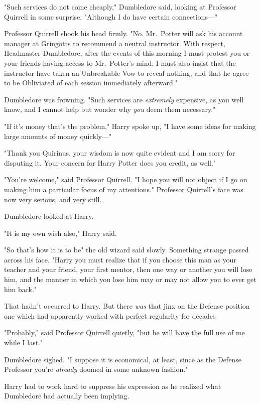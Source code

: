 "Such services do not come cheaply," Dumbledore said, looking at Professor
Quirrell in some surprise. "Although I do have certain connections—"

Professor Quirrell shook his head firmly. "No. Mr.~Potter will ask his account
manager at Gringotts to recommend a neutral instructor. With respect,
Headmaster Dumbledore, after the events of this morning I must protest you or
your friends having access to Mr.~Potter's mind. I must also insist that the
instructor have taken an Unbreakable Vow to reveal nothing, and that he agree
to be Obliviated of each session immediately afterward."

Dumbledore was frowning. "Such services are \emph{extremely} expensive, as you
well know, and I cannot help but wonder why \emph{you} deem them necessary."

"If it's money that's the problem," Harry spoke up, "I have some ideas for
making large amounts of money quickly—"

"Thank you Quirinus, your wisdom is now quite evident and I am sorry for
disputing it. Your concern for Harry Potter does you credit, as well."

"You're welcome," said Professor Quirrell. "I hope you will not object if I go
on making him a particular focus of my attentions." Professor Quirrell's face
was now very serious, and very still.

Dumbledore looked at Harry.

"It is my own wish also," Harry said.

"So that's how it is to be{\el}" the old wizard said slowly. Something
strange passed across his face. "Harry{\el} you must realize that if you
choose this man as your teacher and your friend, your first mentor, then one
way or another you will lose him, and the manner in which you lose him may or
may not allow you to ever get him back."

That hadn't occurred to Harry. But there \emph{was} that jinx on the Defense
position{\el} one which had apparently worked with perfect regularity for
decades{\el}

"Probably," said Professor Quirrell quietly, "but he will have the full use of
me while I last."

Dumbledore sighed. "I suppose it is economical, at least, since as the Defense
Professor you're \emph{already} doomed in some unknown fashion."

Harry had to work hard to suppress his expression as he realized what
Dumbledore had actually been implying.

